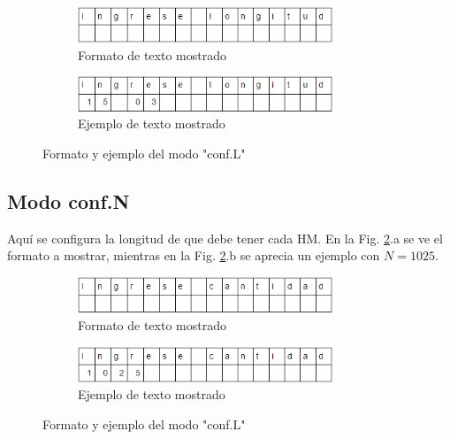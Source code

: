 \documentclass[main_conf.tex]{subfiles}
\begin{document}
\begin{figure}[!t]
  \centering
  \begin{subfigure}[b]{0.5\textwidth}
    \centering
    \includegraphics[width=3.0in]{../img/modo/conf_L_view.png}
    \caption{Formato de texto mostrado}
  \end{subfigure}

  \begin{subfigure}[b]{0.5\textwidth}
    \centering
    \includegraphics[width=3.0in]{../img/modo/conf_L_sample.png}
    \caption{Ejemplo de texto mostrado}
  \end{subfigure}

  \caption{Formato y ejemplo del modo "conf.L"}
  \label{Modo_Conf_L}
\end{figure}

\subsection{Modo conf.N}
Aquí se configura la longitud de que debe tener cada HM.
En la Fig. \ref{Modo_Conf_N}.a se ve el formato a mostrar,
mientras en la Fig. \ref{Modo_Conf_N}.b se aprecia un
ejemplo con $N = 1025$.

\begin{figure}[!t]
  \centering
  \begin{subfigure}[b]{0.5\textwidth}
    \centering
    \includegraphics[width=3.0in]{../img/modo/conf_N_view.png}
    \caption{Formato de texto mostrado}
  \end{subfigure}

  \begin{subfigure}[b]{0.5\textwidth}
    \centering
    \includegraphics[width=3.0in]{../img/modo/conf_N_sample.png}
    \caption{Ejemplo de texto mostrado}
  \end{subfigure}

  \caption{Formato y ejemplo del modo "conf.L"}
  \label{Modo_Conf_N}
\end{figure}
\end{document}
